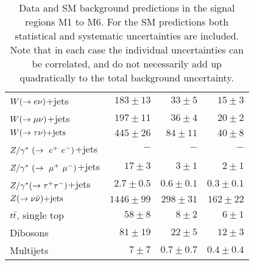 \begin{table}[!ht]
\begin{center}
\begin{small}
\begin{tabular*}{\textwidth}{@{\extracolsep{\fill}}lrrr}
    $W(\rightarrow e \nu)$+jets        &  $183 \pm 13$   & $33 \pm 5$         & $15 \pm 3$ \\

    $W(\rightarrow \mu \nu)$+jets        &  $197 \pm 11$   & $36 \pm 4$         & $20 \pm 2$ \\

    $W(\rightarrow \tau \nu)\text{+jets}$        &  $445 \pm 26$   & $84 \pm 11$        & $40 \pm 8$ \\

    $Z/\gamma^*~(\rightarrow~e^+~e^-)$+jets        &  $-$            & $-$                & $-$ \\

    $Z/\gamma^*~(\rightarrow~\mu^+~\mu^-)$+jets        &  $17 \pm 3$     & $3 \pm 1$          & $2 \pm 1$ \\

    $Z/\gamma^*(\rightarrow \tau^+ \tau^-)$+jets        &  $2.7 \pm 0.5$  & $0.6 \pm 0.1$      & $0.3 \pm 0.1$ \\

    $Z(\rightarrow \nu \bar{\nu})\text{+jets}$        &  $1446 \pm 99$  & $298 \pm 31$       & $162 \pm 22$ \\ 

    $t\bar{t}$, single top   & $58 \pm 8$ & $8 \pm 2$ & $6 \pm 1$ \\

    Dibosons      &  $81 \pm 19$    & $22 \pm 5$         & $12 \pm 3$ \\

    Multijets     &  $7 \pm 7$      & $0.7 \pm 0.7$     & $0.4 \pm 0.4$ \\ 
    
    \hline

    \end{tabular*}
    \end{small}

    \end{center}
    \caption[Data and SM background predictions in the signal regions M1 to M6.]
{Data and SM background predictions in the signal regions M1 to M6. 
      For the SM predictions both statistical and systematic uncertainties are included.
        Note that in each case the individual 
        uncertainties can be correlated, and do not necessarily add up quadratically to the total background uncertainty.
    }
\label{tab:SignalRegions}
\end{table}

